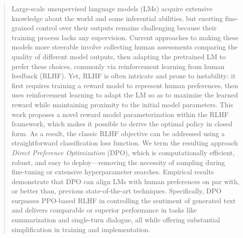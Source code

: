 \begin{abstract}
Large-scale unsupervised language models (LMs) acquire extensive knowledge about the world and some inferential abilities, but exerting fine-grained control over their outputs remains challenging because their training process lacks any supervision. Current approaches to making these models more steerable involve collecting human assessments comparing the quality of different model outputs, then adapting the pretrained LM to prefer these choices, commonly via reinforcement learning from human feedback (RLHF). Yet, RLHF is often intricate and prone to instability: it first requires training a reward model to represent human preferences, then uses reinforcement learning to adapt the LM so as to maximize the learned reward while maintaining proximity to the initial model parameters. This work proposes a novel reward model parameterization within the RLHF framework, which makes it possible to derive the optimal policy in closed form. As a result, the classic RLHF objective can be addressed using a straightforward classification loss function. We term the resulting approach \textit{Direct Preference Optimization} (DPO), which is computationally efficient, robust, and easy to deploy—removing the necessity of sampling during fine-tuning or extensive hyperparameter searches. Empirical results demonstrate that DPO can align LMs with human preferences on par with, or better than, previous state-of-the-art techniques. Specifically, DPO surpasses PPO-based RLHF in controlling the sentiment of generated text and delivers comparable or superior performance in tasks like summarization and single-turn dialogue, all while offering substantial simplification in training and implementation.
\end{abstract}

